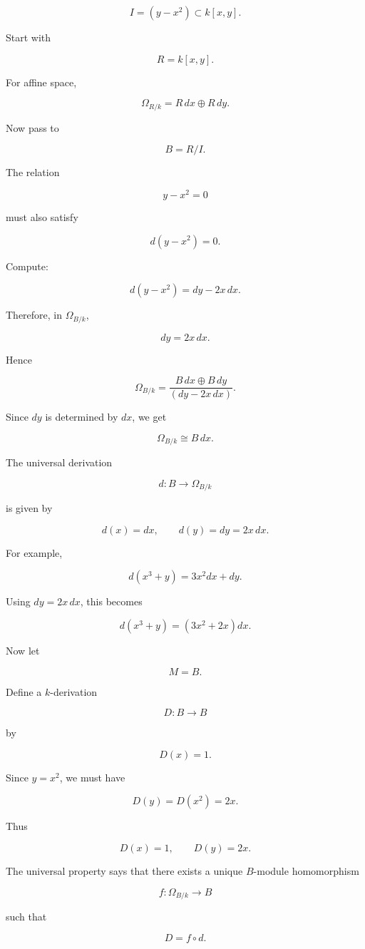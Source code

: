 \documentclass[12pt,a4paper]{article}
\theoremstyle{notespace}
\begin{document}
\[
I=(y-x^2)\subset k[x,y].
\]

Start with

\[
R=k[x,y].
\]

For affine space,

\[
\Omega_{R/k}=R\,dx\oplus R\,dy.
\]

Now pass to

\[
B=R/I.
\]

The relation

\[
y-x^2=0
\]

must also satisfy

\[
d(y-x^2)=0.
\]

Compute:

\[
d(y-x^2)=dy-2x\,dx.
\]

Therefore, in \(\Omega_{B/k}\),

\[
dy=2x\,dx.
\]

Hence

\[
\Omega_{B/k}
=
\frac{B\,dx\oplus B\,dy}{(dy-2x\,dx)}.
\]

Since \(dy\) is determined by \(dx\), we get

\[
\Omega_{B/k}\cong B\,dx.
\]

The universal derivation

\[
d:B\to \Omega_{B/k}
\]

is given by

\[
d(x)=dx,
\qquad
d(y)=dy=2x\,dx.
\]

For example,

\[
d(x^3+y)=3x^2dx+dy.
\]

Using \(dy=2x\,dx\), this becomes

\[
d(x^3+y)=(3x^2+2x)dx.
\]

Now let

\[
M=B.
\]

Define a \(k\)-derivation

\[
D:B\to B
\]

by

\[
D(x)=1.
\]

Since \(y=x^2\), we must have

\[
D(y)=D(x^2)=2x.
\]

Thus

\[
D(x)=1,
\qquad
D(y)=2x.
\]

The universal property says that there exists a unique \(B\)-module homomorphism

\[
f:\Omega_{B/k}\to B
\]

such that

\[
D=f\circ d.
\]
\end{document}
